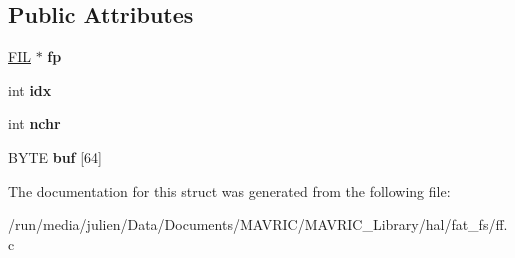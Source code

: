 \subsection*{Public Attributes}
\begin{DoxyCompactItemize}
\item 
\hypertarget{structputbuff_a5c7baa85e569be17f4888f5d92f4453c}{\hyperlink{structFIL}{F\+I\+L} $\ast$ {\bfseries fp}}\label{structputbuff_a5c7baa85e569be17f4888f5d92f4453c}

\item 
\hypertarget{structputbuff_a10a3ca93af8df07e9836ebd5230c06d8}{int {\bfseries idx}}\label{structputbuff_a10a3ca93af8df07e9836ebd5230c06d8}

\item 
\hypertarget{structputbuff_a125366bfe48077e6f562f95e30b4604a}{int {\bfseries nchr}}\label{structputbuff_a125366bfe48077e6f562f95e30b4604a}

\item 
\hypertarget{structputbuff_ae623199e5d2851f95050670170f20329}{B\+Y\+T\+E {\bfseries buf} \mbox{[}64\mbox{]}}\label{structputbuff_ae623199e5d2851f95050670170f20329}

\end{DoxyCompactItemize}


The documentation for this struct was generated from the following file\+:\begin{DoxyCompactItemize}
\item 
/run/media/julien/\+Data/\+Documents/\+M\+A\+V\+R\+I\+C/\+M\+A\+V\+R\+I\+C\+\_\+\+Library/hal/fat\+\_\+fs/ff.\+c\end{DoxyCompactItemize}
